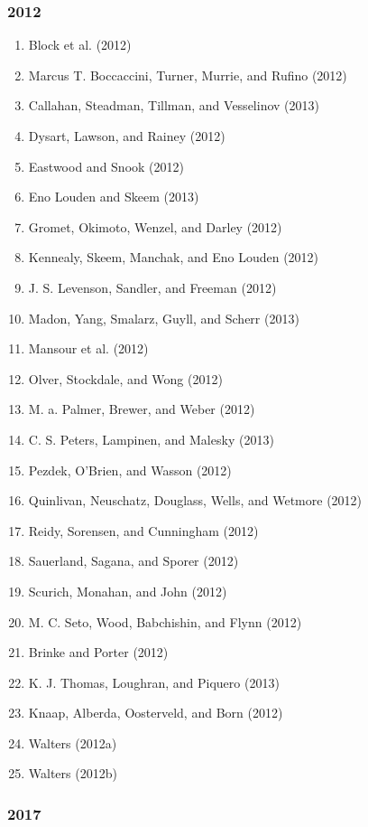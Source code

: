 \documentclass[english,man]{apa6}
\providecommand{\tightlist}{%
  \setlength{\itemsep}{0pt}\setlength{\parskip}{0pt}}
\theoremstyle{definition}
\theoremstyle{definition}
\theoremstyle{definition}
\theoremstyle{remark}
\begin{document}
\subsubsection{2012}\label{section-24}

\begin{enumerate}
\def\labelenumi{\arabic{enumi})}
\tightlist
\item
  Block et al. (2012)
\item
  Marcus T. Boccaccini, Turner, Murrie, and Rufino (2012)
\item
  Callahan, Steadman, Tillman, and Vesselinov (2013)
\item
  Dysart, Lawson, and Rainey (2012)
\item
  Eastwood and Snook (2012)
\item
  Eno Louden and Skeem (2013)
\item
  Gromet, Okimoto, Wenzel, and Darley (2012)
\item
  Kennealy, Skeem, Manchak, and Eno Louden (2012)
\item
  J. S. Levenson, Sandler, and Freeman (2012)
\item
  Madon, Yang, Smalarz, Guyll, and Scherr (2013)
\item
  Mansour et al. (2012)
\item
  Olver, Stockdale, and Wong (2012)
\item
  M. a. Palmer, Brewer, and Weber (2012)
\item
  C. S. Peters, Lampinen, and Malesky (2013)
\item
  Pezdek, O'Brien, and Wasson (2012)
\item
  Quinlivan, Neuschatz, Douglass, Wells, and Wetmore (2012)
\item
  Reidy, Sorensen, and Cunningham (2012)
\item
  Sauerland, Sagana, and Sporer (2012)
\item
  Scurich, Monahan, and John (2012)
\item
  M. C. Seto, Wood, Babchishin, and Flynn (2012)
\item
  Brinke and Porter (2012)
\item
  K. J. Thomas, Loughran, and Piquero (2013)
\item
  Knaap, Alberda, Oosterveld, and Born (2012)
\item
  Walters (2012a)
\item
  Walters (2012b)
\end{enumerate}

\subsubsection{2017}\label{section-25}
\end{document}
